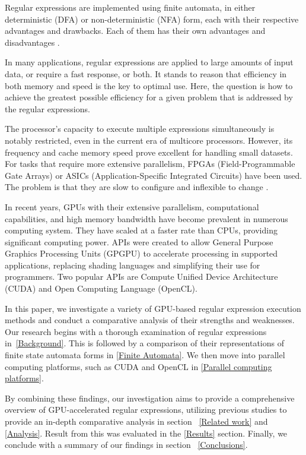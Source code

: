 \documentclass[10pt,onecolumn,twoside,english,a4paper]{article}
\begin{document}
Regular expressions are implemented using finite automata, in either deterministic (DFA) or non-deterministic (NFA) form, each with their respective advantages and drawbacks. Each of them has their own advantages and disadvantages \cite{Becchi:regex_large_dataset,Nourian:DemystifyingFSA,Zu:GPU-NFA}.

In many applications, regular expressions are applied to large amounts of input data, or require a fast response, or both. It stands to reason that efficiency in both memory and speed is the key to optimal use\cite{Xia:FSA-scaling}.
Here, the question is how to achieve the greatest possible efficiency for a given problem that is addressed by the regular expressions.

The processor's capacity to execute multiple expressions simultaneously is notably restricted, even in the current era of multicore processors\cite{Lee:myths}. However, its frequency and cache memory speed prove excellent for handling small datasets. For tasks that require more extensive parallelism, FPGAs (Field-Programmable Gate Arrays) or ASICs (Application-Specific Integrated Circuits) have been used. The problem is that they are slow to configure\cite{XU:regex_alg_slow} and inflexible to change \cite{fuchs2019accelerator,Liu:Asynchronous}.

In recent years, GPUs with their extensive parallelism, computational capabilities, and high memory bandwidth have become prevalent in numerous computing system. They have scaled at a faster rate than CPUs, providing significant computing power\cite{sun2019summarizing,Liu:Asynchronous}. APIs were created to allow General Purpose Graphics Processing Units (GPGPU) to accelerate processing in supported applications, replacing shading languages and simplifying their use for programmers. Two popular APIs are Compute Unified Device Architecture (CUDA) and Open Computing Language (OpenCL)\cite{Fang:Comparison-cuda-opencl}.

In this paper, we investigate a variety of GPU-based regular expression execution methods and conduct a comparative analysis of their strengths and weaknesses. Our research begins with a thorough examination of regular expressions in~\ref{Background}. This is followed by a comparison of their representations of finite state automata forms in \ref{Finite Automata}. We then move into parallel computing platforms, such as CUDA and OpenCL in \ref{Parallel computing platforms}.

By combining these findings, our investigation aims to provide a comprehensive overview of GPU-accelerated regular expressions, utilizing previous studies to provide an in-depth comparative analysis in section ~\ref{Related work} and \ref{Analysis}. Result from this was evaluated in the \ref{Results} section. Finally, we conclude with a summary of our findings in section ~\ref{Conclusions}.
\end{document}
